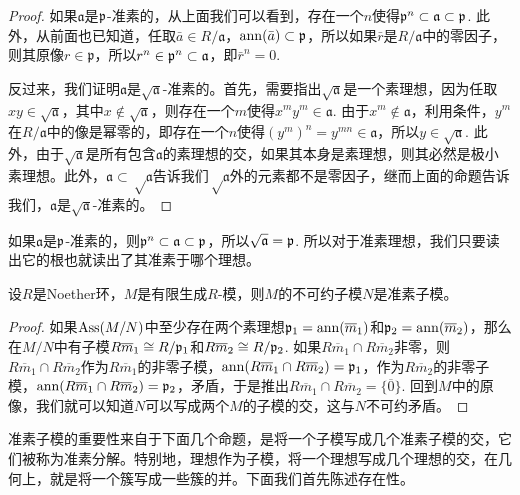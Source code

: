 \begin{proof}
如果$\mathfrak{a}$是$\mathfrak{p}$-准素的，从上面我们可以看到，存在一个$n$使得$\mathfrak{p}^n\subset \mathfrak{a}\subset \mathfrak{p}$. 此外，从前面也已知道，任取$\bar{a}\in R/\mathfrak{a}$，$\operatorname{ann}(\bar{a})\subset \mathfrak{p}$，所以如果$\bar r$是$R/\mathfrak{a}$中的零因子，则其原像$r\in \mathfrak{p}$，所以$r^n\in \mathfrak{p}^n\subset \mathfrak{a}$，即$\bar r^n=0$. 

反过来，我们证明$\mathfrak{a}$是$\sqrt{\mathfrak{a}}$-准素的。首先，需要指出$\sqrt{\mathfrak{a}}$是一个素理想，因为任取$xy\in \sqrt{\mathfrak{a}}$，其中$x\not\in \sqrt{\mathfrak{a}}$，则存在一个$m$使得$x^m y^m\in \mathfrak{a}$. 由于$x^m\not\in \mathfrak{a}$，利用条件，$y^m$在$R/\mathfrak{a}$中的像是幂零的，即存在一个$n$使得$(y^m)^n=y^{mn}\in \mathfrak{a}$，所以$y\in\sqrt{\mathfrak{a}}$. 此外，由于$\sqrt{\mathfrak{a}}$是所有包含$\mathfrak{a}$的素理想的交，如果其本身是素理想，则其必然是极小素理想。此外，$\mathfrak{a}\subset \sqrt\mathfrak{a}$告诉我们$\sqrt\mathfrak{a}$外的元素都不是零因子，继而上面的命题告诉我们，$\mathfrak{a}$是$\sqrt{\mathfrak{a}}$-准素的。
\end{proof}

如果$\mathfrak{a}$是$\mathfrak{p}$-准素的，则$\mathfrak{p}^n\subset \mathfrak{a}\subset \mathfrak{p}$，所以$\sqrt{\mathfrak{a}}=\mathfrak{p}$. 所以对于准素理想，我们只要读出它的根也就读出了其准素于哪个理想。

\begin{lem}
设$R$是Noether环，$M$是有限生成$R$-模，则$M$的不可约子模$N$是准素子模。
\end{lem}

\begin{proof}
	如果$\operatorname{Ass}(M/N)$中至少存在两个素理想$\mathfrak{p}_1=\operatorname{ann}(\overline{m}_1)$和$\mathfrak{p}_2=\operatorname{ann}(\overline{m}_2)$，那么在$M/N$中有子模$R\overline{m}_1\cong R/\mathfrak{p}_1$和$R\overline{m}_2\cong R/\mathfrak{p}_2$. 如果$R\overline{m}_1\cap R\overline{m}_2$非零，则$R\overline{m}_1\cap R\overline{m}_2$作为$R\overline{m}_1$的非零子模，$\operatorname{ann}(R\overline{m}_1\cap R\overline{m}_2)=\mathfrak{p}_1$，作为$R\overline{m}_2$的非零子模，$\operatorname{ann}(R\overline{m}_1\cap R\overline{m}_2)=\mathfrak{p}_2$，矛盾，于是推出$R\overline{m}_1\cap R\overline{m}_2=\{\overline{0}\}$. 回到$M$中的原像，我们就可以知道$N$可以写成两个$M$的子模的交，这与$N$不可约矛盾。
\end{proof}

准素子模的重要性来自于下面几个命题，是将一个子模写成几个准素子模的交，它们被称为准素分解。特别地，理想作为子模，将一个理想写成几个理想的交，在几何上，就是将一个簇写成一些簇的并。下面我们首先陈述存在性。

